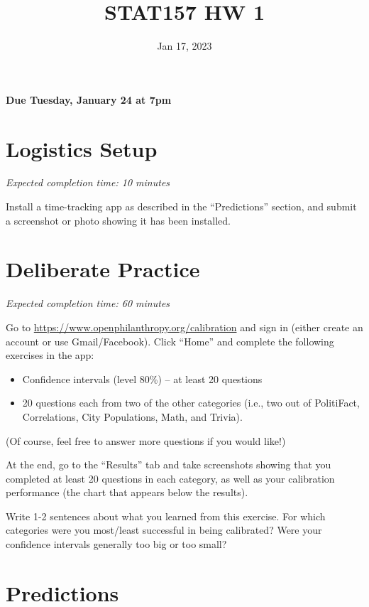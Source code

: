 \documentclass[11pt]{article}
\title{STAT157 HW 1}
\date{Jan 17, 2023}
\begin{document}
\maketitle

\hfill \textbf{Due Tuesday, January 24 at 7pm}

\section*{Logistics Setup}

\emph{Expected completion time: 10 minutes}

Install a time-tracking app as described in the ``Predictions'' section, and submit a screenshot or photo showing it has been 
installed.

\section*{Deliberate Practice}

\emph{Expected completion time: 60 minutes}

Go to \url{https://www.openphilanthropy.org/calibration} and sign in (either create an account or use 
Gmail/Facebook). Click ``Home'' and complete the following exercises in the app:

\begin{itemize}

\item Confidence intervals (level 80\%) -- at least 20 questions
\item 20 questions each from two of the other categories (i.e., two out of PolitiFact, Correlations, City Populations, Math, and Trivia).

\end{itemize}

(Of course, feel free to answer more questions if you would like!)

At the end, go to the ``Results'' tab and take screenshots showing that 
you completed at least 20 questions in each category, as well as your calibration 
performance (the chart that appears below the results).

Write 1-2 sentences about what you learned from this exercise. For which categories were you most/least successful in being calibrated? Were your confidence intervals generally too big or too small? 

\section*{Predictions}
\end{document}
